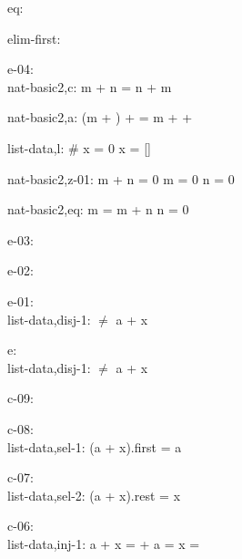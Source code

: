 \documentclass[a4paper]{article}
\begin{document}
\bigskip

eq:\\ 

\bigskip

elim-first:\\ 

\bigskip

e-04:\\ nat-basic2,c: 
 \Fol m + n = n + m



nat-basic2,a: 
 \Fol (m + ) +  = m +  + 



list-data,l: 
 \Fol \# x = 0 \Equiv x = []



nat-basic2,z-01: 
 \Fol m + n = 0 \Equiv m = 0 \And n = 0



nat-basic2,eq: 
 \Fol m = m + n \Equiv n = 0



\bigskip

e-03:\\ 

\bigskip

e-02:\\ 

\bigskip

e-01:\\ list-data,disj-1: 
 \Fol [] $\neq$ a + x



\bigskip

e:\\ list-data,disj-1: 
 \Fol [] $\neq$ a + x



\bigskip

c-09:\\ 

\bigskip

c-08:\\ list-data,sel-1: 
 \Fol (a + x).first = a



\bigskip

c-07:\\ list-data,sel-2: 
 \Fol (a + x).rest = x



\bigskip

c-06:\\ list-data,inj-1: 
 \Fol a + x =  +  \Equiv a =  \And x = 
\end{document}
